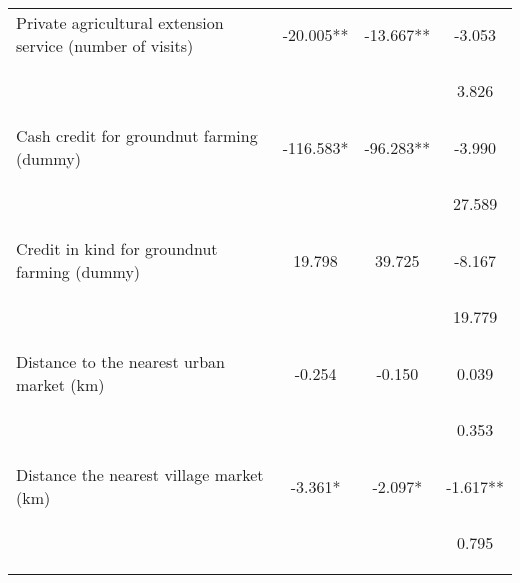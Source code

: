 \begin{center}
\begin{tabular}{lccc}
Private agricultural extension service (number of visits) & -20.005** & -13.667** & -3.053 \\
\vspace{4pt} & \begin{footnotesize}\end{footnotesize} & \begin{footnotesize}\end{footnotesize} & \begin{footnotesize}3.826\end{footnotesize} \\
Cash credit for groundnut farming (dummy) & -116.583* & -96.283** & -3.990 \\
\vspace{4pt} & \begin{footnotesize}\end{footnotesize} & \begin{footnotesize}\end{footnotesize} & \begin{footnotesize}27.589\end{footnotesize} \\
Credit in kind for groundnut farming (dummy) & 19.798 & 39.725 & -8.167 \\
\vspace{4pt} & \begin{footnotesize}\end{footnotesize} & \begin{footnotesize}\end{footnotesize} & \begin{footnotesize}19.779\end{footnotesize} \\
Distance to the nearest urban market (km) & -0.254 & -0.150 & 0.039 \\
\vspace{4pt} & \begin{footnotesize}\end{footnotesize} & \begin{footnotesize}\end{footnotesize} & \begin{footnotesize}0.353\end{footnotesize} \\
Distance the nearest village market (km) & -3.361* & -2.097* & -1.617** \\
\vspace{4pt} & \begin{footnotesize}\end{footnotesize} & \begin{footnotesize}\end{footnotesize} & \begin{footnotesize}0.795\end{footnotesize} \\

\end{tabular}
\end{center}
